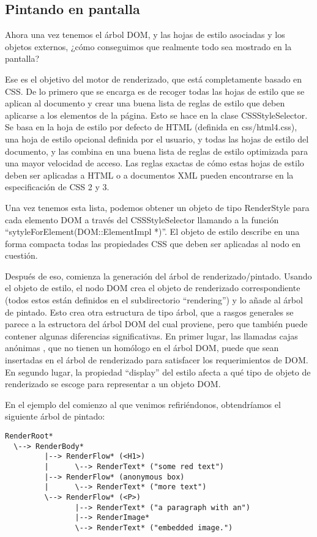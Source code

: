 \subsection{Pintando en pantalla}\label{khtml_render}

Ahora una vez tenemos el árbol DOM, y las hojas de estilo asociadas y los objetos externos, ¿cómo conseguimos que realmente todo sea mostrado en la pantalla?

Ese es el objetivo del motor de renderizado, que está completamente basado en CSS. De lo primero que se encarga es de recoger todas las hojas de estilo que se aplican al documento y crear una buena lista de reglas de estilo que deben aplicarse a los elementos de la página. Esto se hace en la clase CSSStyleSelector. Se basa en la hoja de estilo por defecto de HTML (definida en css/html4.css), una hoja de estilo opcional definida por el usuario, y todas las hojas de estilo del documento, y las combina en una buena lista de reglas de estilo optimizada para una mayor velocidad de acceso. Las reglas exactas de cómo estas hojas de estilo deben ser aplicadas a HTML o a documentos XML pueden encontrarse en la especificación de CSS 2 y 3.

Una vez tenemos esta lista, podemos obtener un objeto de tipo RenderStyle para cada elemento DOM a través del CSSStyleSelector llamando a la función ``sytyleForElement(DOM::ElementImpl *)''. El objeto de estilo describe en una forma compacta todas las propiedades CSS que deben ser aplicadas al nodo en cuestión.

Después de eso, comienza la generación del árbol de renderizado/pintado. Usando el objeto de estilo, el nodo DOM crea el objeto de renderizado correspondiente (todos estos están definidos en el subdirectorio ``rendering'') y lo añade al árbol de pintado.  Esto crea otra estructura de tipo árbol, que a rasgos generales se parece a la estructora del árbol DOM del cual proviene, pero que también puede contener algunas diferencias significativas. En primer lugar, las llamadas cajas anónimas \cite{css2.1}, que no tienen un homólogo en el árbol DOM, puede que sean insertadas en el árbol de renderizado para satisfacer los requerimientos de DOM. En segundo lugar, la propiedad ``display'' del estilo afecta a qué tipo de objeto de renderizado se escoge para representar a un objeto DOM.

En el ejemplo del comienzo al que venimos refiriéndonos, obtendríamos el siguiente árbol de pintado:


\begin{verbatim}
RenderRoot*
  \--> RenderBody*
         |--> RenderFlow* (<H1>)
         |      \--> RenderText* ("some red text")
         |--> RenderFlow* (anonymous box)
         |      \--> RenderText* ("more text")
         \--> RenderFlow* (<P>)
                |--> RenderText* ("a paragraph with an")
                |--> RenderImage*
                \--> RenderText* ("embedded image.")
\end{verbatim}

